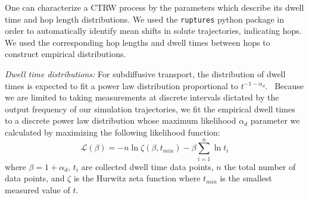 \documentclass{article}
\begin{document}
  One can characterize a CTRW process by the parameters which describe its dwell 
  time and hop length distributions. We used the \texttt{ruptures} python package in 
  order to automatically identify mean shifts in solute trajectories, indicating hops.\cite{truong_ruptures:_2018} 
  We used the corresponding hop lengths and dwell times between hops to construct 
  empirical distributions.
  
  \textit{Dwell time distributions:} For subdiffusive transport, the distribution 
  of dwell times is expected to fit a power law distribution 
  proportional to $t^{-1-\alpha_d}$.~\cite{meroz_toolbox_2015}
  Because we are limited to taking measurements at discrete intervals dictated by the output 
  frequency of our simulation trajectories, we fit the empirical dwell times
  to a discrete power law distribution whose maximum likelihood $\alpha_d$ 
  parameter we calculated by maximizing the following likelihood function: 
  \begin{equation}
	\mathcal{L}(\beta) = -n\ln \zeta(\beta, t_{min}) -
	\beta\sum_{i=1}^{n} \ln t_i 
  \label{eqn:powerlaw_likelihood}
  \end{equation}
  where $\beta = 1 + \alpha_d$, $t_i$ are collected dwell time data points,
  $n$ the total number of data points, and $\zeta$ is the Hurwitz zeta function
  where $t_{min}$ is the smallest measured value of	$t$.~\cite{clauset_power-law_2009}
  
\end{document}
